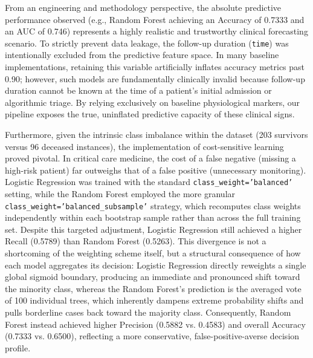 \documentclass[11pt]{article} %
\begin{document}
From an engineering and methodology perspective, the absolute predictive performance observed (e.g., Random Forest achieving an Accuracy of 0.7333 and an AUC of 0.746) represents a highly realistic and trustworthy clinical forecasting scenario. To strictly prevent data leakage, the follow-up duration (\texttt{time}) was intentionally excluded from the predictive feature space. In many baseline implementations, retaining this variable artificially inflates accuracy metrics past 0.90; however, such models are fundamentally clinically invalid because follow-up duration cannot be known at the time of a patient's initial admission or algorithmic triage. By relying exclusively on baseline physiological markers, our pipeline exposes the true, uninflated predictive capacity of these clinical signs.

Furthermore, given the intrinsic class imbalance within the dataset (203 survivors versus 96 deceased instances), the implementation of cost-sensitive learning proved pivotal. In critical care medicine, the cost of a false negative (missing a high-risk patient) far outweighs that of a false positive (unnecessary monitoring). Logistic Regression was trained with the standard \texttt{class\_weight='balanced'} setting, while the Random Forest employed the more granular \texttt{class\_weight='balanced\_subsample'} strategy, which recomputes class weights independently within each bootstrap sample rather than across the full training set. Despite this targeted adjustment, Logistic Regression still achieved a higher Recall (0.5789) than Random Forest (0.5263). This divergence is not a shortcoming of the weighting scheme itself, but a structural consequence of how each model aggregates its decision: Logistic Regression directly reweights a single global sigmoid boundary, producing an immediate and pronounced shift toward the minority class, whereas the Random Forest's prediction is the averaged vote of 100 individual trees, which inherently dampens extreme probability shifts and pulls borderline cases back toward the majority class. Consequently, Random Forest instead achieved higher Precision (0.5882 vs. 0.4583) and overall Accuracy (0.7333 vs. 0.6500), reflecting a more conservative, false-positive-averse decision profile. 
\end{document}
